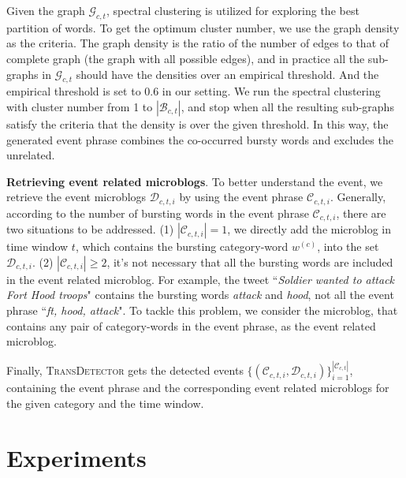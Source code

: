 \documentclass[runningheads,a4paper]{llncs}
\begin{document}
Given the graph \(\mathcal{G}_{c,t}\), spectral clustering\cite{von2007tutorial} is utilized for exploring the best partition of words. 
To get the optimum cluster number, we use the graph density as the criteria.
The graph density is the ratio of the number of edges to that of complete graph (the graph with all possible edges), and in practice all the sub-graphs in \(\mathcal{G}_{c,t}\) should have the densities over an empirical threshold. 
And the empirical threshold is set to 0.6 in our setting.
We run the spectral clustering with cluster number from 1 to \(|\mathcal{B}_{c,t}|\), and stop when all the resulting sub-graphs satisfy the criteria that the density is over the given threshold. 
In this way, the generated event phrase combines the co-occurred bursty words and excludes the unrelated. 


\textbf{Retrieving event related microblogs}. 
To better understand the event, we retrieve the event microblogs \(\mathcal{D}_{c,t,i}\) by using the event phrase \(\mathcal{C}_{c,t,i}\).
Generally, according to the number of bursting words in the event phrase \(\mathcal{C}_{c,t,i}\), there are two situations to be addressed. 
(1) \(|\mathcal{C}_{c,t,i}|=1\), we directly add the microblog in time window \(t\), which contains the bursting category-word \(w^{(c)}\), into the set \(\mathcal{D}_{c,t,i}\).
(2) \(|\mathcal{C}_{c,t,i}|\geq 2\), it's not necessary that all the bursting words are included in the event related microblog.
For example, the tweet ``\textit{Soldier wanted to attack Fort Hood troops}" contains the bursting words \textit{attack} and \textit{hood}, not all the event phrase ``\textit{ft, hood, attack}". 
To tackle this problem, we consider the microblog, that contains any pair of category-words in the event phrase, as the event related microblog.

Finally, \textsc{TransDetector} gets the detected events \(\{(\mathcal{C}_{c,t,i},\mathcal{D}_{c,t,i})\}_{i=1}^{|\mathcal{C}_{c,t}|}\), containing the event phrase and the corresponding event related microblogs for the given category and the time window.






\section{Experiments}
\end{document}
